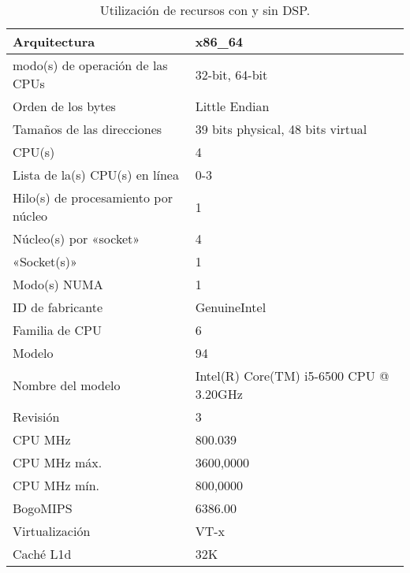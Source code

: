 \documentclass[12pt]{article}
\begin{document}
\begin{table}
\renewcommand{\arraystretch}{1.3}
\caption{Utilización de recursos con y sin DSP.}
\label{res_table}
\centering
\footnotesize
\begin{tabular}{|l|p{5cm}|}
  \hline
Arquitectura                        & x86\_64 \\ \hline
modo(s) de operación de las CPUs    & 32-bit, 64-bit \\ \hline
Orden de los bytes                  & Little Endian \\ \hline
Tamaños de las direcciones          & 39 bits physical, 48 bits virtual \\ \hline
CPU(s)                              & 4 \\ \hline
Lista de la(s) CPU(s) en línea      & 0-3 \\ \hline
Hilo(s) de procesamiento por núcleo & 1 \\ \hline
Núcleo(s) por «socket»              & 4 \\ \hline
«Socket(s)»                          & 1 \\ \hline
Modo(s) NUMA                        & 1 \\ \hline
ID de fabricante                    & GenuineIntel \\ \hline
Familia de CPU                      & 6 \\ \hline
Modelo                              & 94 \\ \hline
Nombre del modelo                   & Intel(R) Core(TM) i5-6500 CPU @ 3.20GHz \\ \hline
Revisión                            & 3 \\ \hline
CPU MHz                             & 800.039 \\ \hline
CPU MHz máx.                        & 3600,0000 \\ \hline
CPU MHz mín.                        & 800,0000 \\ \hline
BogoMIPS                            & 6386.00 \\ \hline
Virtualización                      & VT-x \\ \hline
Caché L1d                           & 32K \\ \hline

\end{tabular}
\end{table}
\end{document}
